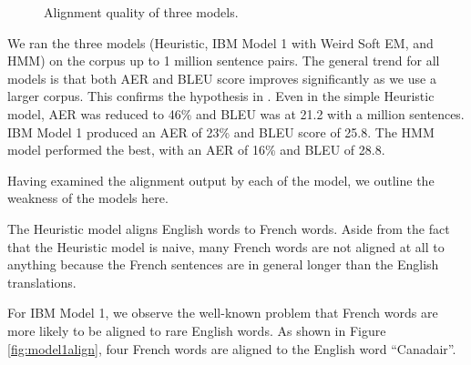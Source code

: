 \documentclass[12pt]{article}   %
\begin{document}
\begin{figure}[h*]
\centering
{}
\label{fig:perf}
\caption{Alignment quality of three models.}
\end{figure}

We ran the three models (Heuristic, IBM Model 1 with Weird Soft EM, and HMM) on the corpus up to 1 million sentence pairs. The general trend for all models is that both AER and BLEU score improves significantly as we use a larger corpus. This confirms the hypothesis in \cite{data-effect}. Even in the simple Heuristic model, AER was reduced to 46\% and BLEU was at 21.2 with a million sentences. IBM Model 1 produced an AER of 23\% and BLEU score of 25.8. The HMM model performed the best, with an AER of 16\% and BLEU of 28.8.

Having examined the alignment output by each of the model, we outline the weakness of the models here.

The Heuristic model aligns English words to French words. Aside from the fact that the Heuristic model is naive, many French words are not aligned at all to anything because the French sentences are in general longer than the English translations.

For IBM Model 1, we observe the well-known problem that French words are more likely to be aligned to rare English words. As shown in Figure \ref{fig:model1align}, four French words are aligned to the English word ``Canadair''. 
\end{document}

